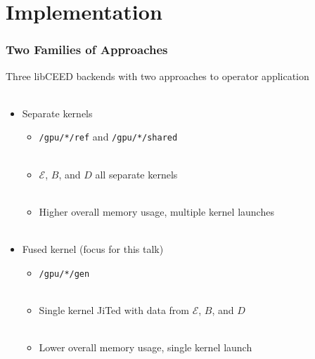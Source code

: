 \documentclass{beamer}
\begin{document}
\section{Implementation}

\begin{frame}[fragile]
\begin{center}
\frametitle{Two Families of Approaches}

Three libCEED backends with two approaches to operator application\\

~\\

\begin{itemize}

\item Separate kernels

\begin{itemize}

\item \lstinline{/gpu/*/ref} and \lstinline{/gpu/*/shared}\\

~\\

\item $\mathcal{E}$, {\color{blue(ncs)}$B$}, and {\color{applegreen}$D$} all separate kernels\\

~\\

\item Higher overall memory usage, multiple kernel launches\\

~\\

\end{itemize}

\item Fused kernel (focus for this talk)

\begin{itemize}

\item \lstinline{/gpu/*/gen}\\

~\\

\item Single kernel JiTed with data from $\mathcal{E}$, {\color{blue(ncs)}$B$}, and {\color{applegreen}$D$}\\

~\\

\item Lower overall memory usage, single kernel launch\\

\end{itemize}

\end{itemize}

\end{center}
\end{frame}
\end{document}
